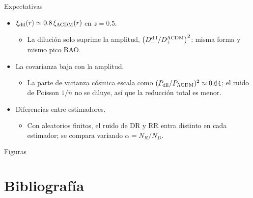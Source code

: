 \documentclass[aspectratio=169]{beamer}
\begin{document}
\begin{frame}{Expectativas}
  \begin{itemize}
    \setlength\itemsep{1.0em}
    \item $\xi_{\rm dil}(r)\simeq0.8\,\xi_{\Lambda{\rm CDM}}(r)$ en $z=0.5$.
      \begin{itemize}
        \item La dilución solo suprime la amplitud, $\big(D_+^{\rm dil}/D_+^{\Lambda{\rm CDM}}\big)^2$:
          misma forma y mismo pico BAO.
      \end{itemize}
    \item La covarianza baja con la amplitud.
      \begin{itemize}
        \item La parte de varianza cósmica escala como $(P_{\rm dil}/P_{\Lambda{\rm CDM}})^2\approx0.64$;
          el ruido de Poisson $1/\bar n$ no se diluye, así que la reducción total es menor.
      \end{itemize}
    \item Diferencias entre estimadores.
      \begin{itemize}
        \item Con aleatorios finitos, el ruido de DR y RR entra distinto en cada estimador;
          se compara variando $\alpha=N_R/N_D$.
      \end{itemize}
  \end{itemize}
\end{frame}

\begin{frame}{Figuras}
  \centering
\end{frame}

\section{Bibliografía}
\end{document}
